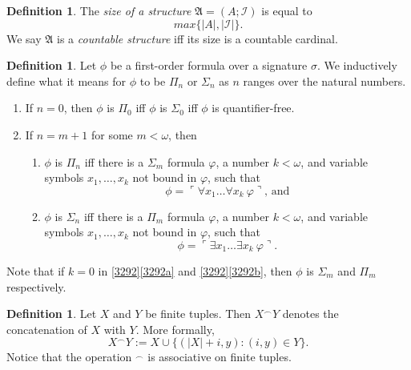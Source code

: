 \documentclass[12pt, twoside]{memoir}
\numberwithin{equation}{section}
\theoremstyle{definition}
\newtheorem{defi}[thm]{Definition}
\theoremstyle{remark}
\theoremstyle{definition}
\theoremstyle{definition}
\theoremstyle{definition}
\theoremstyle{remark}
\begin{document}
\begin{defi}
The \emph{size of a structure} $\mathfrak{A} = (A; \mathcal{I})$ is equal to $$max\{|A|, |\mathcal{I}|\}.$$ We say $\mathfrak{A}$ is a \emph{countable structure} iff its size is a countable cardinal.
\end{defi}

\begin{defi}\label{def25}
Let $\phi$ be a first-order formula over a signature $\sigma$. We inductively define what it means for $\phi$ to be $\Pi_n$ or $\Sigma_n$ as $n$ ranges over the natural numbers.
\begin{enumerate}[label=(\arabic*)]
    \item If $n = 0$, then $\phi$ is $\Pi_0$ iff $\phi$ is $\Sigma_0$ iff $\phi$ is quantifier-free.
    \item\label{3292} If $n = m + 1$ for some $m < \omega$, then 
    \begin{enumerate}[label=(\alph*)]
        \item\label{3292a} $\phi$ is $\Pi_n$ iff there is a $\Sigma_m$ formula $\varphi$, a number $k < \omega$, and variable symbols $x_1, \dots, x_k$ not bound in $\varphi$, such that 
        \begin{equation*}
            \phi = \ulcorner \forall x_1 \dots \forall x_k \ \varphi \urcorner \text{, and}
        \end{equation*}
        \item\label{3292b} $\phi$ is $\Sigma_n$ iff there is a $\Pi_m$ formula $\varphi$, a number $k < \omega$, and variable symbols $x_1, \dots, x_k$ not bound in $\varphi$, such that 
        \begin{equation*}
            \phi = \ulcorner \exists x_1 \dots \exists x_k \ \varphi \urcorner \text{.}
        \end{equation*}
    \end{enumerate}
\end{enumerate}
Note that if $k = 0$ in \ref{3292}\ref{3292a} and \ref{3292}\ref{3292b}, then $\phi$ is $\Sigma_m$ and $\Pi_m$ respectively.
\end{defi}

\begin{defi}
Let $X$ and $Y$ be finite tuples. Then $X^\frown Y$ denotes the concatenation of $X$ with $Y$. More formally, 
\begin{equation*}
    X^\frown Y := X \cup \{(|X|+i, y) : (i, y) \in Y\} \text{.}
\end{equation*}
Notice that the operation $^\frown$ is associative on finite tuples.
\end{defi}
\end{document}

